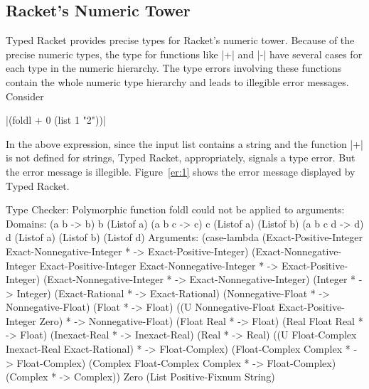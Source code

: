 \subsection*{Racket's Numeric Tower}
Typed Racket provides precise types for Racket's numeric tower. Because
of the precise numeric types, the type for functions like \scheme|+| and
\scheme|-| have several cases for each type in the numeric
hierarchy. The type errors involving these functions contain the whole
numeric type hierarchy and leads to illegible error messages. Consider

\begin{center}
  \scheme|(foldl + 0 (list 1 "2"))|
\end{center}

In the above expression, since the input list contains a string and the
function \scheme|+| is not defined for strings, Typed Racket,
appropriately, signals a type error. But the error message is illegible.
Figure~\ref{er:1} shows the error message displayed by Typed Racket.
\def\keywordfont#1{{\it#1}}
\begin{figure*}
\begin{plain}
\begin{schemedisplay}

Type Checker: Polymorphic function foldl could not be applied to arguments:
Domains: (a b -> b) b (Listof a)
         (a b c -> c) c (Listof a) (Listof b)
         (a b c d -> d) d (Listof a) (Listof b) (Listof d)
Arguments:
(case-lambda
  (Exact-Positive-Integer Exact-Nonnegative-Integer * -> Exact-Positive-Integer)
  (Exact-Nonnegative-Integer Exact-Positive-Integer
   Exact-Nonnegative-Integer * -> Exact-Positive-Integer)
  (Exact-Nonnegative-Integer * -> Exact-Nonnegative-Integer)
  (Integer * -> Integer)
  (Exact-Rational * -> Exact-Rational)
  (Nonnegative-Float * -> Nonnegative-Float)
  (Float * -> Float)
  ((U Nonnegative-Float Exact-Positive-Integer Zero) * -> Nonnegative-Float)
  (Float Real * -> Float)
  (Real Float Real * -> Float)
  (Inexact-Real * -> Inexact-Real)
  (Real * -> Real)
  ((U Float-Complex Inexact-Real Exact-Rational) * -> Float-Complex)
  (Float-Complex Complex * -> Float-Complex)
  (Complex Float-Complex Complex * -> Float-Complex)
  (Complex * -> Complex)) Zero (List Positive-Fixnum String)
\end{schemedisplay}
\end{plain}
\caption{Type Error: \emph{foldl}}
\label{er:1}
\end{figure*}

